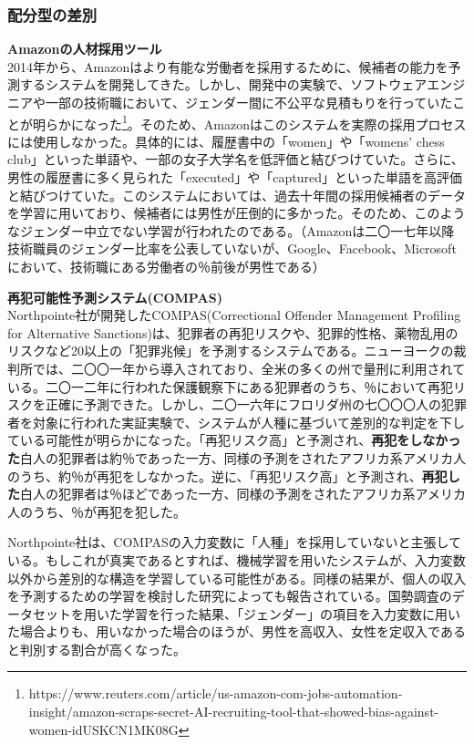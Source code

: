 \documentclass[b5j,twoside,twocolumn]{utarticle}
\begin{document}
\subsubsection*{配分型の差別}
\textbf{Amazonの人材採用ツール}\\
2014年から、Amazonはより有能な労働者を採用するために、候補者の能力を予測するシステムを開発してきた。しかし、開発中の実験で、ソフトウェアエンジニアや一部の技術職において、ジェンダー間に不公平な見積もりを行っていたことが明らかになった\footnote{https://www.reuters.com/article/us-amazon-com-jobs-automation-insight/amazon-scraps-secret-AI-recruiting-tool-that-showed-bias-against-women-idUSKCN1MK08G}。そのため、Amazonはこのシステムを実際の採用プロセスには使用しなかった。具体的には、履歴書中の「women」や「womens' chess club」といった単語や、一部の女子大学名を低評価と結びつけていた。さらに、男性の履歴書に多く見られた「executed」や「captured」といった単語を高評価と結びつけていた。このシステムにおいては、過去十年間の採用候補者のデータを学習に用いており、候補者には男性が圧倒的に多かった。そのため、このようなジェンダー中立でない学習が行われたのである。（Amazonは二〇一七年以降技術職員のジェンダー比率を公表していないが、Google、Facebook、Microsoftにおいて、技術職にある労働者の％前後が男性である）


\textbf{再犯可能性予測システム(COMPAS)}\\
Northpointe社が開発したCOMPAS(Correctional Offender Management Profiling for Alternative Sanctions)は、犯罪者の再犯リスクや、犯罪的性格、薬物乱用のリスクなど20以上の「犯罪兆候」を予測するシステムである。ニューヨークの裁判所では、二〇〇一年から導入されており、全米の多くの州で量刑に利用されている。二〇一二年に行われた保護観察下にある犯罪者のうち、％において再犯リスクを正確に予測できた。しかし、二〇一六年にフロリダ州の七〇〇〇人の犯罪者を対象に行われた実証実験\cite{compas}で、システムが人種に基づいて差別的な判定を下している可能性が明らかになった。「再犯リスク高」と予測され、\textbf{再犯をしなかった}白人の犯罪者は約％であった一方、同様の予測をされたアフリカ系アメリカ人のうち、約％が再犯をしなかった。逆に、「再犯リスク高」と予測され、\textbf{再犯した}白人の犯罪者は％ほどであった一方、同様の予測をされたアフリカ系アメリカ人のうち、％が再犯を犯した。

Northpointe社は、COMPASの入力変数に「人種」を採用していないと主張している。もしこれが真実であるとすれば、機械学習を用いたシステムが、入力変数以外から差別的な構造を学習している可能性がある。同様の結果が、個人の収入を予測するための学習を検討した研究によっても報告されている。国勢調査のデータセットを用いた学習を行った結果、「ジェンダー」の項目を入力変数に用いた場合よりも、用いなかった場合のほうが、男性を高収入、女性を定収入であると判別する割合が高くなった\cite{Calders2010}。
\end{document}
